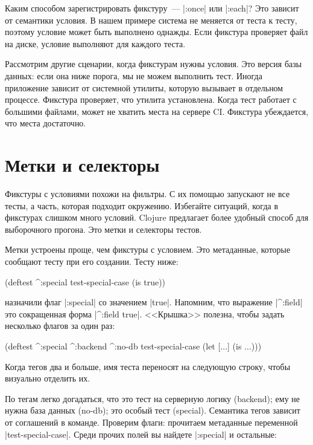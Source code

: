Каким способом зарегистрировать фикстуру~--- \spverb|:once| или \spverb|:each|?
Это зависит от семантики условия. В нашем примере система не меняется от теста к
тесту, поэтому условие может быть выполнено однажды. Если фикстура проверяет
файл на диске, условие выполняют для каждого теста.

Рассмотрим другие сценарии, когда фикстурам нужны условия. Это версия базы
данных: если она ниже порога, мы не можем выполнить тест. Иногда приложение
зависит от системной утилиты, которую вызывает в отдельном процессе. Фикстура
проверяет, что утилита установлена. Когда тест работает с большими файлами,
может не хватить места на сервере CI. Фикстура убеждается, что места достаточно.

\section{Метки и селекторы}

Фикстуры с условиями похожи на фильтры. С их помощью запускают не все тесты, а
часть, которая подходит окружению. Избегайте ситуаций, когда в фикстурах слишком
много условий. Clojure предлагает более удобный способ для выборочного
прогона. Это метки и селекторы тестов.

Метки устроены проще, чем фикстуры с условием. Это метаданные, которые сообщают
тесту при его создании. Тесту ниже:

\begin{english}
  \begin{clojure}
(deftest ^:special test-special-case
  (is true))
  \end{clojure}
\end{english}

\noindent
назначили флаг \spverb|:special| со значением \spverb|true|. Напомним, что
выражение \spverb|^:field| это сокращенная форма \spverb|^{:field true}|.
<<Крышка>> полезна, чтобы задать несколько флагов за один раз:

\begin{english}
  \begin{clojure}
(deftest ^:special ^:backend ^:no-db
  test-special-case
  (let [...]
    (is ...)))
  \end{clojure}
\end{english}

Когда тегов два и больше, имя теста переносят на следующую строку, чтобы
визуально отделить их.

По тегам легко догадаться, что это тест на серверную логику (backend); ему не
нужна база данных (no-db); это особый тест (special). Семантика тегов зависит от
соглашений в команде. Проверим флаги: прочитаем метаданные переменной
\spverb|test-special-case|. Среди прочих полей вы найдете \spverb|:special| и
остальные:

